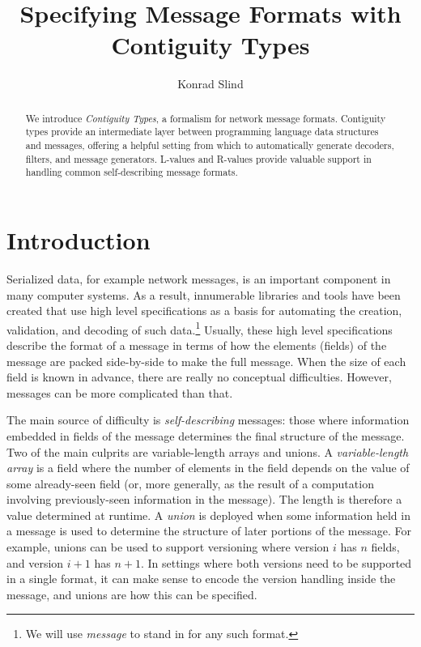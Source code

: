 \documentclass[sigplan,10pt,anonymous,review]{acmart}\settopmatter{printfolios=true,printccs=false,printacmref=false}
\begin{document}
\title{Specifying Message Formats with \\ Contiguity Types}

\author{Konrad Slind}

\begin{abstract}
We introduce \emph{Contiguity Types}, a formalism for network message
formats. Contiguity types provide an intermediate layer between
programming language data structures and messages, offering a helpful
setting from which to automatically generate decoders, filters, and
message generators. L-values and R-values provide valuable
support in handling common self-describing message formats.
\end{abstract}

\maketitle


\section{Introduction}\label{sec:intro}

Serialized data, for example network messages, is an important
component in many computer systems.  As a result, innumerable
libraries and tools have been created that use high level
specifications as a basis for automating the creation, validation, and
decoding of such data.\footnote{We will use \emph{message} to stand in
  for any such format.} Usually, these high level specifications
describe the format of a message in terms of how the elements (fields)
of the message are packed side-by-side to make the full message. When
the size of each field is known in advance, there are really no
conceptual difficulties. However, messages can be more complicated
than that.

The main source of difficulty is \emph{self-describing} messages:
those where information embedded in fields of the message determines
the final structure of the message. Two of the main culprits are
variable-length arrays and unions. A \emph{variable-length array} is a
field where the number of elements in the field depends on the value
of some already-seen field (or, more generally, as the result of a
computation involving previously-seen information in the message).
The length is therefore a value determined at runtime. A \emph{union}
is deployed when some information held in a message is used to
determine the structure of later portions of the message. For example,
unions can be used to support versioning where version $i$ has $n$
fields, and version $i+1$ has $n+1$. In settings where both versions
need to be supported in a single format, it can make sense to encode
the version handling inside the message, and unions are how this can
be specified.
\end{document}
